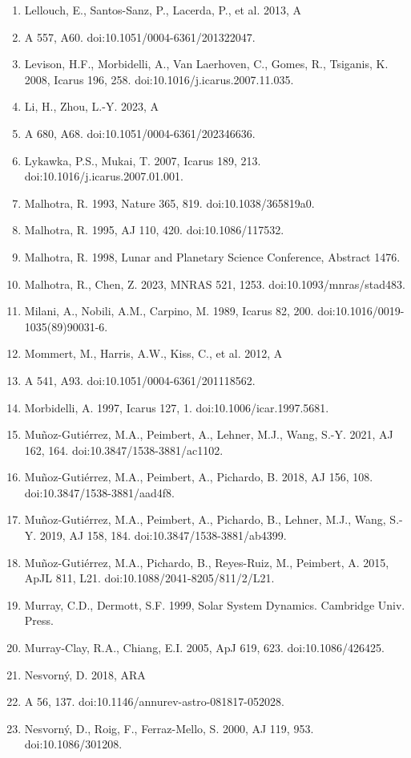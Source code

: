 \documentclass[12pt]{article}
\begin{document}
\begin{enumerate}
\item Lellouch, E., Santos-Sanz, P., Lacerda, P., et al. 2013, A
\item A 557, A60. doi:10.1051/0004-6361/201322047.
\item Levison, H.F., Morbidelli, A., Van Laerhoven, C., Gomes, R., Tsiganis, K. 2008, Icarus 196, 258. doi:10.1016/j.icarus.2007.11.035.
\item Li, H., Zhou, L.-Y. 2023, A
\item A 680, A68. doi:10.1051/0004-6361/202346636.
\item Lykawka, P.S., Mukai, T. 2007, Icarus 189, 213. doi:10.1016/j.icarus.2007.01.001.
\item Malhotra, R. 1993, Nature 365, 819. doi:10.1038/365819a0.
\item Malhotra, R. 1995, AJ 110, 420. doi:10.1086/117532.
\item Malhotra, R. 1998, Lunar and Planetary Science Conference, Abstract 1476.
\item Malhotra, R., Chen, Z. 2023, MNRAS 521, 1253. doi:10.1093/mnras/stad483.
\item Milani, A., Nobili, A.M., Carpino, M. 1989, Icarus 82, 200. doi:10.1016/0019-1035(89)90031-6.
\item Mommert, M., Harris, A.W., Kiss, C., et al. 2012, A
\item A 541, A93. doi:10.1051/0004-6361/201118562.
\item Morbidelli, A. 1997, Icarus 127, 1. doi:10.1006/icar.1997.5681.
\item Muñoz-Gutiérrez, M.A., Peimbert, A., Lehner, M.J., Wang, S.-Y. 2021, AJ 162, 164. doi:10.3847/1538-3881/ac1102.
\item Muñoz-Gutiérrez, M.A., Peimbert, A., Pichardo, B. 2018, AJ 156, 108. doi:10.3847/1538-3881/aad4f8.
\item Muñoz-Gutiérrez, M.A., Peimbert, A., Pichardo, B., Lehner, M.J., Wang, S.-Y. 2019, AJ 158, 184. doi:10.3847/1538-3881/ab4399.
\item Muñoz-Gutiérrez, M.A., Pichardo, B., Reyes-Ruiz, M., Peimbert, A. 2015, ApJL 811, L21. doi:10.1088/2041-8205/811/2/L21.
\item Murray, C.D., Dermott, S.F. 1999, Solar System Dynamics. Cambridge Univ. Press.
\item Murray-Clay, R.A., Chiang, E.I. 2005, ApJ 619, 623. doi:10.1086/426425.
\item Nesvorný, D. 2018, ARA
\item A 56, 137. doi:10.1146/annurev-astro-081817-052028.
\item Nesvorný, D., Roig, F., Ferraz-Mello, S. 2000, AJ 119, 953. doi:10.1086/301208.

\end{enumerate}
\end{document}

